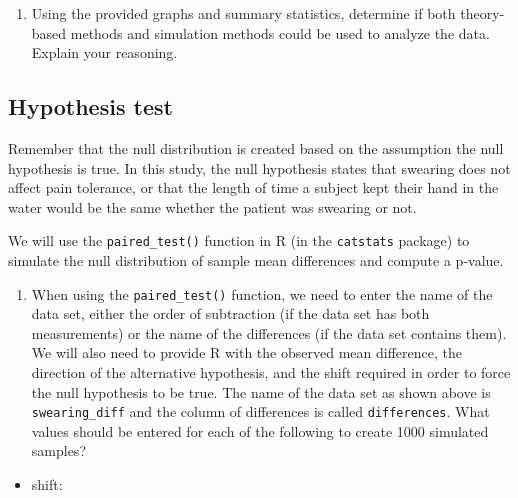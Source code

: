 \documentclass[
]{report}
\providecommand{\tightlist}{%
  \setlength{\itemsep}{0pt}\setlength{\parskip}{0pt}}
\begin{document}
\begin{enumerate}
\def\labelenumi{\arabic{enumi}.}
\setcounter{enumi}{7}
\tightlist
\item
  Using the provided graphs and summary statistics, determine if both theory-based methods and simulation methods could be used to analyze the data. Explain your reasoning.
\end{enumerate}

\vspace{1in}

\hypertarget{hypothesis-test-1}{%
\subsection*{Hypothesis test}\label{hypothesis-test-1}}

Remember that the null distribution is created based on the assumption the null hypothesis is true. In this study, the null hypothesis states that swearing does not affect pain tolerance, or that the length of time a subject kept their hand in the water would be the same whether the patient was swearing or not.

We will use the \texttt{paired\_test()} function in R (in the \texttt{catstats} package) to simulate the null distribution of sample mean differences and compute a p-value.

\newpage

\begin{enumerate}
\def\labelenumi{\arabic{enumi}.}
\setcounter{enumi}{8}
\tightlist
\item
  When using the \texttt{paired\_test()} function, we need to enter the name of the data set, either the order of subtraction (if the data set has both measurements) or the name of the differences (if the data set contains them). We will also need to provide R with the observed mean difference, the direction of the alternative hypothesis, and the shift required in order to force the null hypothesis to be true. The name of the data set as shown above is \texttt{swearing\_diff} and the column of differences is called \texttt{differences}. What values should be entered for each of the following to create 1000 simulated samples?
\end{enumerate}

\vspace{1mm}

\begin{itemize}
\tightlist
\item
  shift:
\end{itemize}
\end{document}
